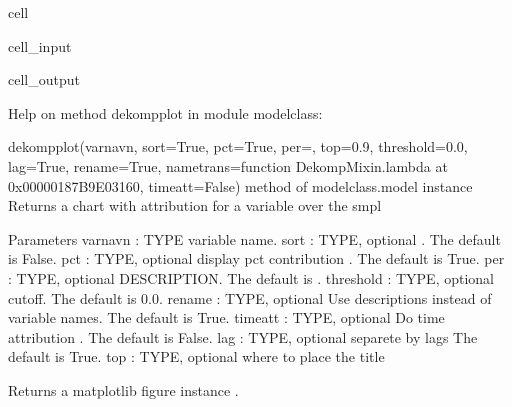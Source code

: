 \documentclass[letterpaper,10pt,english]{jupyterBook}
\begin{document}
\begin{sphinxuseclass}{cell}\begin{sphinxVerbatimInput}

\begin{sphinxuseclass}{cell_input}
\begin{sphinxVerbatim}[commandchars=\\\{\}]
\end{sphinxVerbatim}

\end{sphinxuseclass}\end{sphinxVerbatimInput}
\begin{sphinxVerbatimOutput}

\begin{sphinxuseclass}{cell_output}
\begin{sphinxVerbatim}[commandchars=\\\{\}]
Help on method dekomp\PYGZus{}plot in module modelclass:

dekomp\PYGZus{}plot(varnavn, sort=True, pct=True, per=\PYGZsq{}\PYGZsq{}, top=0.9, threshold=0.0, lag=True, rename=True, nametrans=\PYGZlt{}function Dekomp\PYGZus{}Mixin.\PYGZlt{}lambda\PYGZgt{} at 0x00000187B9E03160\PYGZgt{}, time\PYGZus{}att=False) method of modelclass.model instance
    Returns  a chart with attribution for a variable over the smpl  
    
    Parameters
    \PYGZhy{}\PYGZhy{}\PYGZhy{}\PYGZhy{}\PYGZhy{}\PYGZhy{}\PYGZhy{}\PYGZhy{}\PYGZhy{}\PYGZhy{}
    varnavn : TYPE
        variable name.
    sort : TYPE, optional
        . The default is False.
    pct : TYPE, optional
        display pct contribution . The default is True.
    per : TYPE, optional
        DESCRIPTION. The default is \PYGZsq{}\PYGZsq{}.
    threshold : TYPE, optional
        cutoff. The default is 0.0.
    rename : TYPE, optional
        Use descriptions instead of variable names. The default is True.
    time\PYGZus{}att : TYPE, optional
        Do time attribution . The default is False.
    lag : TYPE, optional
       separete by lags The default is True.           
    top : TYPE, optional
      where to place the title 
       
    
    Returns
    \PYGZhy{}\PYGZhy{}\PYGZhy{}\PYGZhy{}\PYGZhy{}\PYGZhy{}\PYGZhy{}
    a matplotlib figure instance .
\end{sphinxVerbatim}

\end{sphinxuseclass}\end{sphinxVerbatimOutput}

\end{sphinxuseclass}
\end{document}
